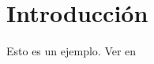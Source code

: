 \chapter{Introducción}
\label{cap:introduccion}

Esto es un ejemplo. Ver en  \cite{darwin2009origen} \cite{del1984luces}